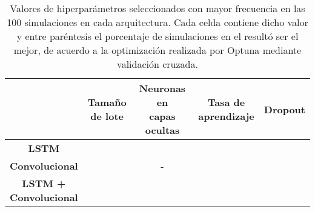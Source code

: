 \begin{table}[ht]
    \centering
    \renewcommand{\arraystretch}{1.2}
    \begin{tabular}{|c|c|c|c|c|}
        \hline
            & \makecell{\textbf{Tamaño}\\\textbf{de lote}}
            & \makecell{\textbf{Neuronas en}\\\textbf{capas ocultas}}
            & \makecell{\textbf{Tasa de}\\\textbf{aprendizaje}}
            & \textbf{Dropout} \\ \hline\hline
        \textbf{LSTM}
            &  &  &  &  \\ \hline
        \textbf{Convolucional}
            &   & -          &  &  \\ \hline
        \makecell{\textbf{LSTM +}\\\textbf{Convolucional}}
            &   &  &  &  \\
        \hline
    \end{tabular}
    \caption{Valores de hiperparámetros seleccionados con mayor frecuencia en las 100
    simulaciones en cada arquitectura. Cada celda contiene dicho valor y entre paréntesis
    el porcentaje de simulaciones en el resultó ser el mejor, de acuerdo a la optimización
    realizada por Optuna mediante validación cruzada.}
    \label{tab:hyperparams_exp1}
\end{table}